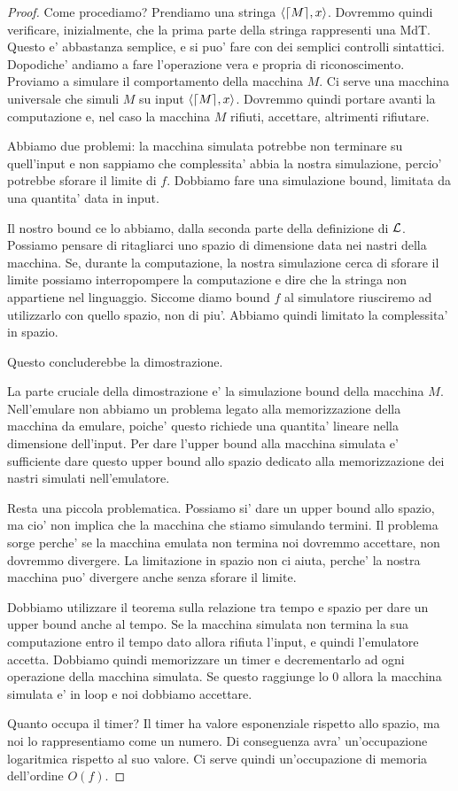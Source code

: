 \begin{proof}
    Come procediamo? Prendiamo una stringa $\langle \lceil M \rceil, x \rangle$. Dovremmo quindi verificare,
    inizialmente, che la prima parte della stringa rappresenti una MdT. Questo e' abbastanza
    semplice, e si puo' fare con dei semplici controlli sintattici. Dopodiche' andiamo a fare
    l'operazione vera e propria di riconoscimento. Proviamo a simulare il comportamento della
    macchina $M$. Ci serve una macchina universale che simuli $M$ su input $\langle \lceil M \rceil, x \rangle$.
    Dovremmo quindi portare avanti la computazione e, nel caso la macchina $M$ rifiuti, accettare,
    altrimenti rifiutare.

    Abbiamo due problemi: la macchina simulata potrebbe non terminare su quell'input e non sappiamo
    che complessita' abbia la nostra simulazione, percio' potrebbe sforare il limite di $f$.
    Dobbiamo fare una simulazione bound, limitata da una quantita' data in input. 

    Il nostro bound ce lo abbiamo, dalla seconda parte della definizione di $\mathcal{L}$. Possiamo
    pensare di ritagliarci uno spazio di dimensione data nei nastri della macchina. Se, durante la
    computazione, la nostra simulazione cerca di sforare il limite possiamo interropompere la
    computazione e dire che la stringa non appartiene nel linguaggio. Siccome diamo bound $f$ al
    simulatore riusciremo ad utilizzarlo con quello spazio, non di piu'. Abbiamo quindi limitato la
    complessita' in spazio.

    Questo concluderebbe la dimostrazione.

    La parte cruciale della dimostrazione e' la simulazione bound della macchina $M$. Nell'emulare
    non abbiamo un problema legato alla memorizzazione della macchina da emulare, poiche' questo
    richiede una quantita' lineare nella dimensione dell'input. Per dare l'upper bound alla macchina
    simulata e' sufficiente dare questo upper bound allo spazio dedicato alla memorizzazione dei
    nastri simulati nell'emulatore.

    Resta una piccola problematica. Possiamo si' dare un upper bound allo spazio, ma cio' non
    implica che la macchina che stiamo simulando termini. Il problema sorge perche' se la macchina
    emulata non termina noi dovremmo accettare, non dovremmo divergere. La limitazione in spazio non
    ci aiuta, perche' la nostra macchina puo' divergere anche senza sforare il limite.

    Dobbiamo utilizzare il teorema sulla relazione tra tempo e spazio per dare un upper bound anche
    al tempo. Se la macchina simulata non termina la sua computazione entro il tempo dato allora
    rifiuta l'input, e quindi l'emulatore accetta. Dobbiamo quindi memorizzare un timer e
    decrementarlo ad ogni operazione della macchina simulata. Se questo raggiunge lo 0 allora la
    macchina simulata e' in loop e noi dobbiamo accettare.

    Quanto occupa il timer? Il timer ha valore esponenziale rispetto allo spazio, ma noi lo
    rappresentiamo come un numero. Di conseguenza avra' un'occupazione logaritmica rispetto al suo
    valore. Ci serve quindi un'occupazione di memoria dell'ordine $O(f)$. 
\end{proof}

